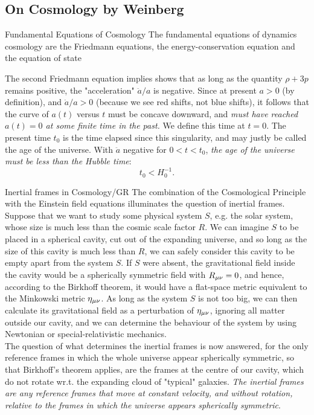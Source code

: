 \subsection{On Cosmology by Weinberg}
\begin{mybox}{Fundamental Equations of Cosmology}
	The fundamental equations of dynamics cosmology are the Friedmann equations, the energy-conservation equation and the equation of state
\end{mybox}
The second Friedmann equation implies shows that as long as the quantity $\rho+3p$ remains positive, the "acceleration" $\ddot{a}/a$ is negative. Since at present $a>0$ (by definition), and $\dot{a}/a >0$ (because we see red shifts, not blue shifts), it follows that the curve of $a(t)$ versus $t$ must be concave downward, and \emph{must have reached $a(t)=0$ at some finite time in the past.} We define this time at $t=0$. The present time $t_0$ is the time elapsed since this singularity, and may justly be called the age of the universe. With $\ddot{a}$ negative for $0<t<t_0$, \emph{the age of the universe must be less than the Hubble time}:
\begin{equation}
t_0 < H^{-1}_0.
\end{equation}
\begin{mybox}{Inertial frames in Cosmology/GR}
	The combination of the Cosmological Principle with the Einstein field equations illuminates the question of inertial frames. Suppose that we want to study some physical system $S$, e.g. the solar system, whose size is much less than the cosmic scale factor $R$. We can imagine $S$ to be placed in a spherical cavity, cut out of the expanding universe, and so long as the size of this cavity is much less than $R$, we can safely consider this cavity to be empty apart from the system $S$. If $S$ were absent, the gravitational field inside the cavity would be a spherically symmetric field with $R_{\mu \nu}=0$, and hence, according to the Birkhoff theorem, it would have a flat-space metric equivalent to the Minkowski metric $\eta_{\mu \nu}$. As long as the system $S$ is not too big, we can then calculate its gravitational field as a perturbation of $\eta_{\mu \nu}$, ignoring all matter outside our cavity, and we can determine the behaviour of the system by using Newtonian or special-relativistic mechanics.\\
	The question of what determines the inertial frames is now answered, for the only reference frames in which the whole universe appear spherically symmetric, so that Birkhoff's theorem applies, are the frames at the centre of our cavity, which do not rotate wr.t. the expanding cloud of "typical" galaxies. \emph{The inertial frames are any reference frames that move at constant velocity, and without rotation, relative to the frames in which the universe appears spherically symmetric}.
\end{mybox}
